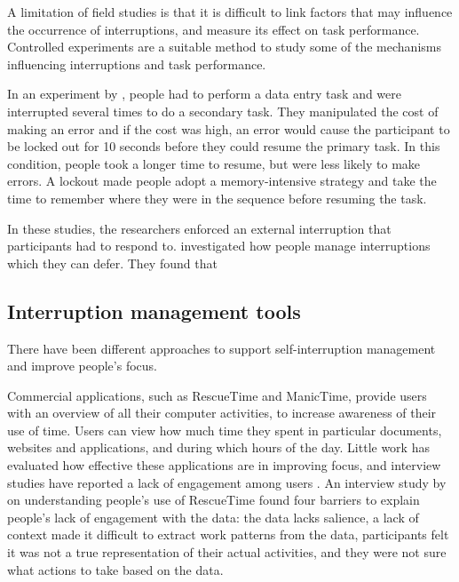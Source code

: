 A limitation of field studies is that it is difficult to link factors that may influence the occurrence of interruptions, and measure its effect on task performance. Controlled experiments are a suitable method to study some of the mechanisms influencing interruptions and task performance. 


In an experiment by \citet{Brumby2013}, people had to perform a data entry task and were interrupted several times to do a secondary task. They manipulated the cost of making an error and if the cost was high, an error would cause the participant to be locked out for 10 seconds before they could resume the primary task. In this condition, people took a longer time to resume, but were less likely to make errors. A lockout made people adopt a memory-intensive strategy and take the time to remember where they were in the sequence before resuming the task. 

%
In these studies, the researchers enforced an external interruption that participants had to respond to. \citet{Salvucci2010} investigated how people manage interruptions which they can defer. They found that  


\subsection{Interruption management tools}
There have been different approaches to support self-interruption management and improve people's focus. 

Commercial applications, such as RescueTime and ManicTime, provide users with an overview of all their computer activities, to increase awareness of their use of time. Users can view how much time they spent in particular documents, websites and applications, and during which hours of the day. Little work has evaluated how effective these applications are in improving focus, and interview studies have reported a lack of engagement among users \citep{Collins2014, Whittaker2016}. An interview study by \citet{Collins2014} on understanding people’s use of RescueTime found four barriers to explain people’s lack of engagement with the data: the data lacks salience, a lack of context made it difficult to extract work patterns from the data, participants felt it was not a true representation of their actual activities, and they were not sure what actions to take based on the data. 

